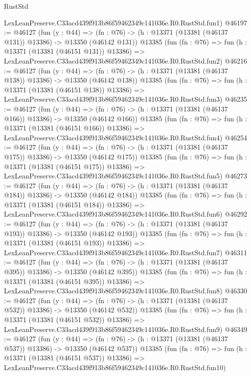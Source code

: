 \begin{lexlean}{RustStd}
\begin{coremodule}
    LexLeanPreserve.C33acd439f913b86f59462349c141036e.R0.RustStd.fun1)
@46197 := @46127
    (fun (y : @44) =>
    (fn : @76) -> (h : @13371 (@13381 (@46137 @131)) @13386) -> @13350 (@46142 @131))
    @13385
    (fun (fn : @76) =>
    fun (h : @13371 (@13381 (@46151 @131)) @13386) =>
    LexLeanPreserve.C33acd439f913b86f59462349c141036e.R0.RustStd.fun2)
@46216 := @46127
    (fun (y : @44) =>
    (fn : @76) -> (h : @13371 (@13381 (@46137 @138)) @13386) -> @13350 (@46142 @138))
    @13385
    (fun (fn : @76) =>
    fun (h : @13371 (@13381 (@46151 @138)) @13386) =>
    LexLeanPreserve.C33acd439f913b86f59462349c141036e.R0.RustStd.fun3)
@46235 := @46127
    (fun (y : @44) =>
    (fn : @76) -> (h : @13371 (@13381 (@46137 @166)) @13386) -> @13350 (@46142 @166))
    @13385
    (fun (fn : @76) =>
    fun (h : @13371 (@13381 (@46151 @166)) @13386) =>
    LexLeanPreserve.C33acd439f913b86f59462349c141036e.R0.RustStd.fun4)
@46254 := @46127
    (fun (y : @44) =>
    (fn : @76) -> (h : @13371 (@13381 (@46137 @175)) @13386) -> @13350 (@46142 @175))
    @13385
    (fun (fn : @76) =>
    fun (h : @13371 (@13381 (@46151 @175)) @13386) =>
    LexLeanPreserve.C33acd439f913b86f59462349c141036e.R0.RustStd.fun5)
@46273 := @46127
    (fun (y : @44) =>
    (fn : @76) -> (h : @13371 (@13381 (@46137 @184)) @13386) -> @13350 (@46142 @184))
    @13385
    (fun (fn : @76) =>
    fun (h : @13371 (@13381 (@46151 @184)) @13386) =>
    LexLeanPreserve.C33acd439f913b86f59462349c141036e.R0.RustStd.fun6)
@46292 := @46127
    (fun (y : @44) =>
    (fn : @76) -> (h : @13371 (@13381 (@46137 @193)) @13386) -> @13350 (@46142 @193))
    @13385
    (fun (fn : @76) =>
    fun (h : @13371 (@13381 (@46151 @193)) @13386) =>
    LexLeanPreserve.C33acd439f913b86f59462349c141036e.R0.RustStd.fun7)
@46311 := @46127
    (fun (y : @44) =>
    (fn : @76) -> (h : @13371 (@13381 (@46137 @395)) @13386) -> @13350 (@46142 @395))
    @13385
    (fun (fn : @76) =>
    fun (h : @13371 (@13381 (@46151 @395)) @13386) =>
    LexLeanPreserve.C33acd439f913b86f59462349c141036e.R0.RustStd.fun8)
@46330 := @46127
    (fun (y : @44) =>
    (fn : @76) -> (h : @13371 (@13381 (@46137 @532)) @13386) -> @13350 (@46142 @532))
    @13385
    (fun (fn : @76) =>
    fun (h : @13371 (@13381 (@46151 @532)) @13386) =>
    LexLeanPreserve.C33acd439f913b86f59462349c141036e.R0.RustStd.fun9)
@46349 := @46127
    (fun (y : @44) =>
    (fn : @76) -> (h : @13371 (@13381 (@46137 @537)) @13386) -> @13350 (@46142 @537))
    @13385
    (fun (fn : @76) =>
    fun (h : @13371 (@13381 (@46151 @537)) @13386) =>
    LexLeanPreserve.C33acd439f913b86f59462349c141036e.R0.RustStd.fun10)

\end{coremodule}
\end{lexlean}
